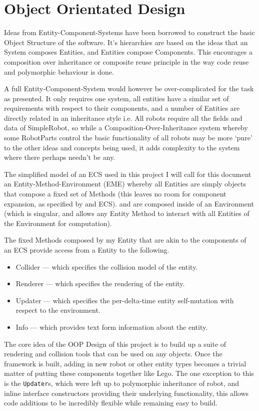 \chapter{Object Orientated Design}

Ideas from Entity-Component-Systems have been borrowed to construct the basic Object Structure of the software. It's hierarchies are based on the ideas that an System composes Entities, and Entities compose Components. This encourages a composition over inheritance or composite reuse principle in the way code reuse and polymorphic behaviour is done.

A full Entity-Component-System would however be over-complicated for the task as presented. It only requires one system, all entities have a similar set of requirements with respect to their components, and a number of Entities are directly related in an inheritance style i.e. All robots require all the fields and data of {\ttfamily SimpleRobot}, so while a Composition-Over-Inheritance system whereby some {\ttfamily RobotParts} control the basic functionality of all robots may be more `pure' to the other ideas and concepts being used, it adds complexity to the system where there perhaps needn't be any. 

The simplified model of an ECS used in this project I will call for this document an Entity-Method-Environment (EME) whereby all Entities are simply objects that compose a fixed set of Methods (this leaves no room for component expansion, as specified by and ECS). and are composed inside of an Environment (which is singular, and allows any Entity Method to interact with all Entities of the Environment for computation).

The fixed Methods composed by my Entity that are akin to the components of an ECS provide access from a Entity to the following.

\begin{itemize}
    \item Collider --- which specifies the collision model of the entity.
    \item Renderer --- which specifies the rendering of the entity.
    \item Updater --- which specifies the per-delta-time entity self-mutation with respect to the environment.
    \item Info --- which provides text form information about the entity.
\end{itemize}

The core idea of the OOP Design of this project is to build up a suite of rendering and collision tools that can be used on any objects. Once the framework is built, adding in new robot or other entity types becomes a trivial matter of putting these components together like Lego. The one exception to this is the \texttt{Updater}s, which were left up to polymorphic inheritance of robot, and inline interface constructors providing their underlying functionality, this allows code additions to be incredibly flexible while remaining easy to build.

